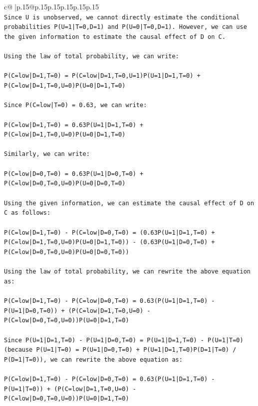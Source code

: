 \documentclass{article}
\begin{document}
{\begin{supertabular}{c@{$\;$}|p{.15\linewidth}@{}p{.15\linewidth}p{.15\linewidth}p{.15\linewidth}p{.15\linewidth}p{.15\linewidth}}
{{{\\ 
\texttt{Since U is unobserved, we cannot directly estimate the conditional probabilities P(U=1|T=0,D=1) and P(U=0|T=0,D=1). However, we can use the given information to estimate the causal effect of D on C.} \\
\\ 
\texttt{Using the law of total probability, we can write:} \\
\\ 
\texttt{P(C=low|D=1,T=0) = P(C=low|D=1,T=0,U=1)P(U=1|D=1,T=0) + P(C=low|D=1,T=0,U=0)P(U=0|D=1,T=0)} \\
\\ 
\texttt{Since P(C=low|T=0) = 0.63, we can write:} \\
\\ 
\texttt{P(C=low|D=1,T=0) = 0.63P(U=1|D=1,T=0) + P(C=low|D=1,T=0,U=0)P(U=0|D=1,T=0)} \\
\\ 
\texttt{Similarly, we can write:} \\
\\ 
\texttt{P(C=low|D=0,T=0) = 0.63P(U=1|D=0,T=0) + P(C=low|D=0,T=0,U=0)P(U=0|D=0,T=0)} \\
\\ 
\texttt{Using the given information, we can estimate the causal effect of D on C as follows:} \\
\\ 
\texttt{P(C=low|D=1,T=0) {-} P(C=low|D=0,T=0) = (0.63P(U=1|D=1,T=0) + P(C=low|D=1,T=0,U=0)P(U=0|D=1,T=0)) {-} (0.63P(U=1|D=0,T=0) + P(C=low|D=0,T=0,U=0)P(U=0|D=0,T=0))} \\
\\ 
\texttt{Using the law of total probability, we can rewrite the above equation as:} \\
\\ 
\texttt{P(C=low|D=1,T=0) {-} P(C=low|D=0,T=0) = 0.63(P(U=1|D=1,T=0) {-} P(U=1|D=0,T=0)) + (P(C=low|D=1,T=0,U=0) {-} P(C=low|D=0,T=0,U=0))P(U=0|D=1,T=0)} \\
\\ 
\texttt{Since P(U=1|D=1,T=0) {-} P(U=1|D=0,T=0) = P(U=1|D=1,T=0) {-} P(U=1|T=0) (because P(U=1|T=0) = P(U=1|D=0,T=0) + P(U=1|D=1,T=0)P(D=1|T=0) / P(D=1|T=0)), we can rewrite the above equation as:} \\
\\ 
\texttt{P(C=low|D=1,T=0) {-} P(C=low|D=0,T=0) = 0.63(P(U=1|D=1,T=0) {-} P(U=1|T=0)) + (P(C=low|D=1,T=0,U=0) {-} P(C=low|D=0,T=0,U=0))P(U=0|D=1,T=0)} \\
\\ 
}}}
\end{supertabular}}
\end{document}
